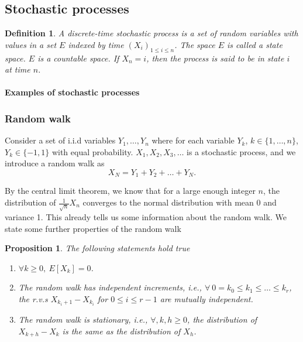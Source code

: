 \documentclass[12pt,a4paper]{article}
\newtheorem{proposition}{Proposition}
\newtheorem{definition}{Definition}
\begin{document}
\newpage
\subsection{Stochastic processes}
\begin{definition}
	A discrete-time stochastic process is a set of random variables with values in a set $E$ indexed by time $(X_i)_{1\leq i\leq n}$. The space $E$ is called a state space. $E$ is a countable space. If $X_n = i$, then the process is said to be in state $i$ at time $n$.
	\end{definition}

	
\paragraph{Examples of stochastic processes}

\subsubsection{Random walk}
Consider a set of i.i.d variables $Y_1,\ldots, Y_n$ where for each variable $Y_k$, $k\in\{1,\ldots, n\}$, $Y_k\in\{-1,1\}$ with equal probability. $X_1,X_2,X_3,\ldots$ is a stochastic process, and we introduce a random walk as 
\begin{equation}
	X_N = Y_1+Y_2+\ldots+ Y_N. 
\end{equation}

By the central limit theorem, we know that for a large enough integer $n$, the
distribution of $\frac{1}{\sqrt{n}} X_n$ converges to the normal distribution with mean 0 and
variance 1. This already tells us some information about the random walk.
We state some further properties of the random walk

\begin{proposition}
	The following statements hold true
	\begin{enumerate}
	\item $\forall k\geq 0, \ E[X_k] = 0$.
	\item The random walk has independent increments, i.e., $\forall\ 0 = k_0 \leq k_1 \leq\ldots\leq k_r$, the r.v.s $X_{k_i+1}-X_{k_i}$ for $0 \leq i \leq r-1$ are mutually independent.
	\item The random walk is stationary, i.e., $\forall, k,h\geq 0$, the distribution of $X_{k+h}-X_k$ is the same as the distribution of $X_h$.	
	\end{enumerate}
	\end{proposition}
	
\end{document}
